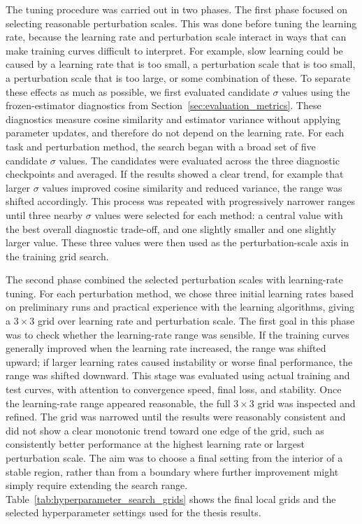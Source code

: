 The tuning procedure was carried out in two phases. The first phase focused on selecting reasonable perturbation scales. This was done before tuning the learning rate, because the learning rate and perturbation scale interact in ways that can make training curves difficult to interpret. For example, slow learning could be caused by a learning rate that is too small, a perturbation scale that is too small, a perturbation scale that is too large, or some combination of these. To separate these effects as much as possible, we first evaluated candidate \(\sigma\) values using the frozen-estimator diagnostics from Section~\ref{sec:evaluation_metrics}. These diagnostics measure cosine similarity and estimator variance without applying parameter updates, and therefore do not depend on the learning rate. For each task and perturbation method, the search began with a broad set of five candidate \(\sigma\) values. The candidates were evaluated across the three diagnostic checkpoints and averaged. If the results showed a clear trend, for example that larger \(\sigma\) values improved cosine similarity and reduced variance, the range was shifted accordingly. This process was repeated with progressively narrower ranges until three nearby \(\sigma\) values were selected for each method: a central value with the best overall diagnostic trade-off, and one slightly smaller and one slightly larger value. These three values were then used as the perturbation-scale axis in the training grid search.

The second phase combined the selected perturbation scales with learning-rate tuning. For each perturbation method, we chose three initial learning rates based on preliminary runs and practical experience with the learning algorithms, giving a \(3\times3\) grid over learning rate and perturbation scale. The first goal in this phase was to check whether the learning-rate range was sensible. If the training curves generally improved when the learning rate increased, the range was shifted upward; if larger learning rates caused instability or worse final performance, the range was shifted downward. This stage was evaluated using actual training and test curves, with attention to convergence speed, final loss, and stability. Once the learning-rate range appeared reasonable, the full \(3\times3\) grid was inspected and refined. The grid was narrowed until the results were reasonably consistent and did not show a clear monotonic trend toward one edge of the grid, such as consistently better performance at the highest learning rate or largest perturbation scale. The aim was to choose a final setting from the interior of a stable region, rather than from a boundary where further improvement might simply require extending the search range. Table~\ref{tab:hyperparameter_search_grids} shows the final local grids and the selected hyperparameter settings used for the thesis results.

